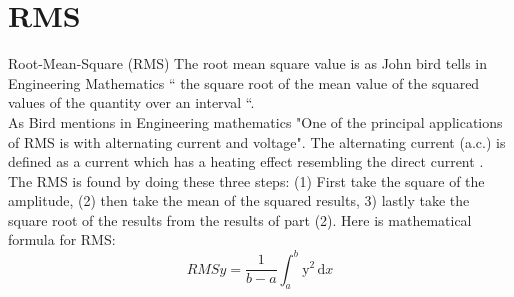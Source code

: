 \section{RMS}
Root-Mean-Square (RMS)
The root mean square value is as John bird tells in Engineering Mathematics \citep{Bird2007} “ the square root of the mean value of the squared values of the quantity over an interval “.
\\
As Bird mentions in Engineering mathematics "One of the principal applications of RMS is with alternating current and voltage". \citep{Bird2007} The alternating current (a.c.) is defined as a current which has a heating effect resembling the direct current \citep{Bird2007}.
\\
The RMS is found by doing these three steps:
(1) First take the square of the amplitude, (2) then take the mean of the squared results, 3) lastly take the square root of the results from the results of part (2)\citep{Bird2007}. Here is \cite{Bird2007} mathematical formula for RMS:
\begin{equation}\label{eq:RMS formular}
RMSy = \frac{1}{b-a}\int_a^b\mathrm{y}^{2}\,\mathrm{d}x

\end{equation}
